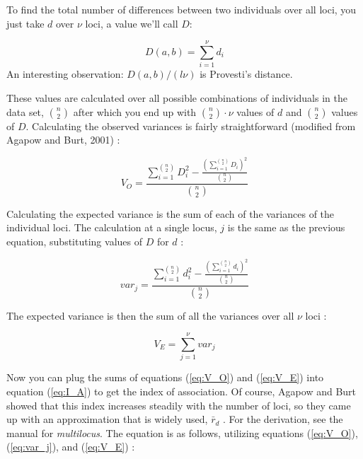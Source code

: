\documentclass[letterpaper]{article}\usepackage[]{graphicx}\usepackage[]{color}
\begin{document}

\noindent
To find the total number of differences between two individuals over all loci,
you just take $d$ over $\nu$ loci, a value we'll call $D$:

\begin{equation}
\label{eq:ia_D}
D(a,b) = \displaystyle \sum_{i=1}^{\nu} d_i
\end{equation}
An interesting observation: $D(a,b)/(l\nu)$ is Provesti's distance.

These values are calculated over all possible combinations of individuals in the
data set, ${n \choose 2}$ after which you end up with ${n \choose 2}\cdot{}\nu$
values of $d$ and ${n \choose 2}$ values of $D$. Calculating the observed
variances is fairly straightforward (modified from Agapow and Burt, 2001)
\cite{Agapow:2001}:

\begin{equation}
\label{eq:V_O}
V_O = \frac{\displaystyle \sum_{i=1}^{n \choose 2} D_{i}^2 - \frac{(\displaystyle\sum_{i=1}^{n \choose 2} D_{i})^2}{{n \choose 2}}}{{n \choose 2}}
\end{equation}

Calculating the expected variance is the sum of each of the variances of the
individual loci. The calculation at a single locus, $j$ is the same as the
previous equation, substituting values of $D$ for $d$ \cite{Agapow:2001}:

\begin{equation}
\label{eq:var_j}
var_j = \frac{\displaystyle \sum_{i=1}^{n \choose 2} d_{i}^2 - \frac{(\displaystyle\sum_{i=1}^{n \choose 2} d_i)^2}{{n \choose 2}}}{{n \choose 2}}
\end{equation}

The expected variance is then the sum of all the variances over all $\nu$ loci
\cite{Agapow:2001}:

\begin{equation}
\label{eq:V_E}
V_E = \displaystyle \sum_{j=1}^{\nu} var_j
\end{equation}

Now you can plug the sums of equations (\ref{eq:V_O}) and (\ref{eq:V_E}) into
equation (\ref{eq:I_A}) to get the index of association. Of course, Agapow and
Burt showed that this index increases steadily with the number of loci, so they
came up with an approximation that is widely used, $\bar r_d$
\cite{Agapow:2001}. For the derivation, see the manual for \textit{multilocus}.
The equation is as follows, utilizing equations (\ref{eq:V_O}),
(\ref{eq:var_j}), and (\ref{eq:V_E}) \cite{Agapow:2001}:
\end{document}

